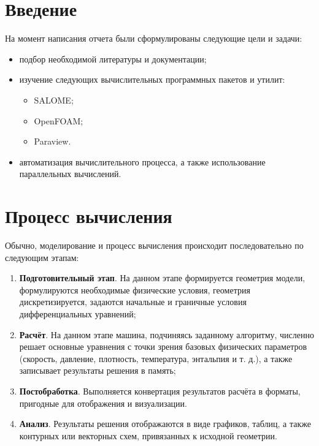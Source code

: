 \documentclass[a4paper, 12pt]{article}
\begin{document}
    

    \tableofcontents
    \newpage

    \section{Введение}
    На момент написания отчета были сформулированы следующие цели и задачи:
    \begin{itemize}
        \item подбор необходимой литературы и документации;
        \item изучение следующих вычислительных программных пакетов и утилит:
        \begin{itemize}
            \item SALOME;
            \item OpenFOAM;
            \item Paraview.
        \end{itemize}
        \item автоматизация вычислительного процесса, а также использование параллельных вычислений.
    \end{itemize}
    \newpage

    \section{Процесс вычисления}
    Обычно, моделирование и процесс вычисления происходит последовательно по следующим этапам:
    \begin{enumerate}
        \item \textbf{Подготовительный этап}. На данном этапе формируется геометрия модели, формулируются необходимые физические условия, геометрия дискретизируется, задаются начальные и граничные условия дифференциальных уравнений;
        \item \textbf{Расчёт}. На данном этапе машина, подчиняясь заданному алгоритму, численно решает основные уравнения с точки зрения базовых физических параметров (скорость, давление, плотность, температура, энтальпия и т. д.), а также записывает результаты решения в память;
        \item \textbf{Постобработка}. Выполняется конвертация результатов расчёта в форматы, пригодные для отображения и визуализации.
        \item \textbf{Анализ}. Результаты решения отображаются в виде графиков, таблиц, а также контурных или векторных схем, привязанных к исходной геометрии.
    \end{enumerate}
\end{document}
